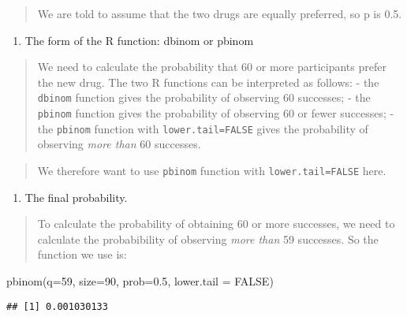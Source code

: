 \documentclass[
]{memoir}
\newenvironment{Shaded}{\begin{snugshade}}{\end{snugshade}}
\newcommand{\AttributeTok}[1]{\textcolor[rgb]{0.77,0.63,0.00}{#1}}
\newcommand{\ConstantTok}[1]{\textcolor[rgb]{0.00,0.00,0.00}{#1}}
\newcommand{\DecValTok}[1]{\textcolor[rgb]{0.00,0.00,0.81}{#1}}
\newcommand{\FloatTok}[1]{\textcolor[rgb]{0.00,0.00,0.81}{#1}}
\newcommand{\FunctionTok}[1]{\textcolor[rgb]{0.00,0.00,0.00}{#1}}
\newcommand{\NormalTok}[1]{#1}
\providecommand{\tightlist}{%
  \setlength{\itemsep}{0pt}\setlength{\parskip}{0pt}}
\begin{document}
\begin{quote}
We are told to assume that the two drugs are equally preferred, so p is 0.5.
\end{quote}

\begin{enumerate}
\def\labelenumi{\alph{enumi})}
\setcounter{enumi}{3}
\tightlist
\item
  The form of the R function: dbinom or pbinom
\end{enumerate}

\begin{quote}
We need to calculate the probability that 60 or more participants prefer the new drug. The two R functions can be interpreted as follows:
- the \texttt{dbinom} function gives the probability of observing 60 successes;
- the \texttt{pbinom} function gives the probability of observing 60 or fewer successes;
- the \texttt{pbinom} function with \texttt{lower.tail=FALSE} gives the probability of observing \emph{more than} 60 successes.
\end{quote}

\begin{quote}
We therefore want to use \texttt{pbinom} function with \texttt{lower.tail=FALSE} here.
\end{quote}

\begin{enumerate}
\def\labelenumi{\alph{enumi})}
\setcounter{enumi}{4}
\tightlist
\item
  The final probability.
\end{enumerate}

\begin{quote}
To calculate the probability of obtaining 60 or more successes, we need to calculate the probabibility of observing \emph{more than} 59 successes. So the function we use is:
\end{quote}

\begin{Shaded}
\begin{Highlighting}[]
\FunctionTok{pbinom}\NormalTok{(}\AttributeTok{q=}\DecValTok{59}\NormalTok{, }\AttributeTok{size=}\DecValTok{90}\NormalTok{, }\AttributeTok{prob=}\FloatTok{0.5}\NormalTok{, }\AttributeTok{lower.tail =} \ConstantTok{FALSE}\NormalTok{)}
\end{Highlighting}
\end{Shaded}

\begin{verbatim}
## [1] 0.001030133
\end{verbatim}
\end{document}
